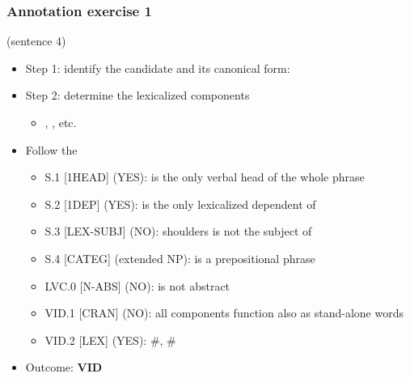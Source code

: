 \documentclass[xcolor=dvipsnames]{beamer}
\begin{document}
\begin{frame} 
\frametitle{Annotation exercise 1 \href{https://mwe.phil.hhu.de/}{\beamergotobutton{[FLAT]}}\href{http://parsemefr.lif.univ-mrs.fr/parseme-st-guidelines/1.3}{\beamergotobutton{[guidelines]}}}


 (sentence 4)
\pause
\begin{scriptsize}
\begin{block}{}
\begin{itemize}
\item Step 1: identify the candidate and its canonical form: 
\item Step 2: determine the lexicalized components
   \begin{itemize}
   \item {}, , etc.
   \end{itemize}
\item Follow the \href{http://parsemefr.lif.univ-mrs.fr/parseme-st-guidelines/1.3/?page=040\_Annotation\_process\_-\_decision\_tree}{}
   \begin{itemize}
   \item S.1 [1HEAD] (YES):  is the only verbal head of the whole phrase
   \item S.2 [1DEP] (YES):  is the only lexicalized dependent of 
   \item S.3 [LEX-SUBJ] (NO):  shoulders is not the subject of 
   \item S.4 [CATEG] (extended NP):  is a prepositional phrase
   \item LVC.0 [N-ABS] (NO):  is not abstract
   \item VID.1 [CRAN] (NO): all components function also as stand-alone words
   \item VID.2 [LEX] (YES): \#, \#
   \end{itemize}
\item Outcome: \textbf{VID}
\end{itemize}
\end{block}

\end{scriptsize}

\end{frame}
\end{document}
